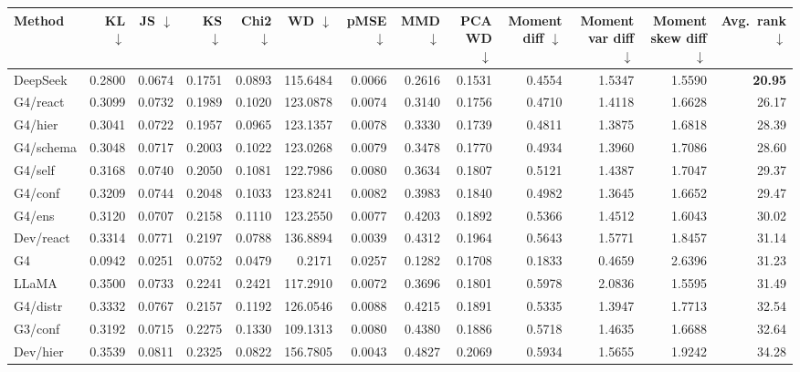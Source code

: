 \begin{table}[t]
\centering
\scriptsize
\setlength\tabcolsep{3pt}
\begin{tabular}{lrrrrrrrrrrrr}
\toprule
\textbf{Method} & \textbf{KL} $\downarrow$ & \textbf{JS} $\downarrow$ & \textbf{KS} $\downarrow$ & \textbf{Chi2} $\downarrow$ & \textbf{WD} $\downarrow$ & \textbf{pMSE} $\downarrow$ & \textbf{MMD} $\downarrow$ & \textbf{PCA WD} $\downarrow$ & \textbf{Moment diff} $\downarrow$ & \textbf{Moment var diff} $\downarrow$ & \textbf{Moment skew diff} $\downarrow$ & \textbf{Avg.\ rank} $\downarrow$ \\
\midrule
DeepSeek & 0.2800 & 0.0674 & 0.1751 & 0.0893 & 115.6484 & 0.0066 & 0.2616 & 0.1531 & 0.4554 & 1.5347 & 1.5590 & \textbf{20.95} \\
\midrule
G4/react & 0.3099 & 0.0732 & 0.1989 & 0.1020 & 123.0878 & 0.0074 & 0.3140 & 0.1756 & 0.4710 & 1.4118 & 1.6628 & 26.17 \\
G4/hier & 0.3041 & 0.0722 & 0.1957 & 0.0965 & 123.1357 & 0.0078 & 0.3330 & 0.1739 & 0.4811 & 1.3875 & 1.6818 & 28.39 \\
G4/schema & 0.3048 & 0.0717 & 0.2003 & 0.1022 & 123.0268 & 0.0079 & 0.3478 & 0.1770 & 0.4934 & 1.3960 & 1.7086 & 28.60 \\
G4/self & 0.3168 & 0.0740 & 0.2050 & 0.1081 & 122.7986 & 0.0080 & 0.3634 & 0.1807 & 0.5121 & 1.4387 & 1.7047 & 29.37 \\
G4/conf & 0.3209 & 0.0744 & 0.2048 & 0.1033 & 123.8241 & 0.0082 & 0.3983 & 0.1840 & 0.4982 & 1.3645 & 1.6652 & 29.47 \\
G4/ens & 0.3120 & 0.0707 & 0.2158 & 0.1110 & 123.2550 & 0.0077 & 0.4203 & 0.1892 & 0.5366 & 1.4512 & 1.6043 & 30.02 \\
Dev/react & 0.3314 & 0.0771 & 0.2197 & 0.0788 & 136.8894 & 0.0039 & 0.4312 & 0.1964 & 0.5643 & 1.5771 & 1.8457 & 31.14 \\
G4 & 0.0942 & 0.0251 & 0.0752 & 0.0479 & 0.2171 & 0.0257 & 0.1282 & 0.1708 & 0.1833 & 0.4659 & 2.6396 & 31.23 \\
\midrule
LLaMA & 0.3500 & 0.0733 & 0.2241 & 0.2421 & 117.2910 & 0.0072 & 0.3696 & 0.1801 & 0.5978 & 2.0836 & 1.5595 & 31.49 \\
\midrule
G4/distr & 0.3332 & 0.0767 & 0.2157 & 0.1192 & 126.0546 & 0.0088 & 0.4215 & 0.1891 & 0.5335 & 1.3947 & 1.7713 & 32.54 \\
G3/conf & 0.3192 & 0.0715 & 0.2275 & 0.1330 & 109.1313 & 0.0080 & 0.4380 & 0.1886 & 0.5718 & 1.4635 & 1.6688 & 32.64 \\
Dev/hier & 0.3539 & 0.0811 & 0.2325 & 0.0822 & 156.7805 & 0.0043 & 0.4827 & 0.2069 & 0.5934 & 1.5655 & 1.9242 & 34.28 \\

\end{tabular}
\end{table}
